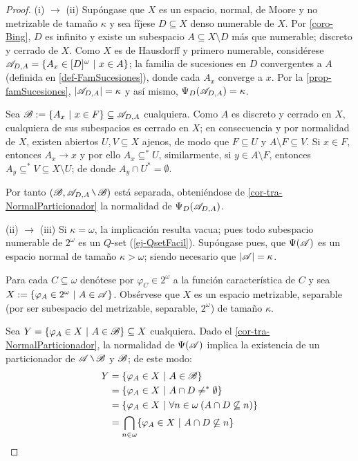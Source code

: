     \begin{proof}
        (i) $\to$ (ii) Supóngase que $X$ es un espacio, normal, de Moore y no metrizable de tamaño $\kappa$ y sea fíjese $D\subseteq X$ denso numerable de $X$. Por \ref{coro-Bing}, $D$ es infinito y existe un subespacio $A \subseteq X \setminus D$ más que numerable; discreto y cerrado de $X$. Como $X$ es de Hausdorff y primero numerable, considérese $ \mathscr{A}_{D,A}=\{A_x \in [D]^\omega \text{ $|$ } x \in A\} $; la familia de sucesiones en $D$ convergentes a $A$ (definida en \ref{def-FamSucesiones}), donde cada $A_x$ converge a $x$. Por la \autoref{prop-famSucesiones}, $|\mathscr{A}_{D,A}|=\kappa$ y así mismo, $\Psi_D(\mathscr{A}_{D,A})=\kappa$.
        
        Sea $\mathscr{B}:=\{A_x \text{ $|$ } x \in F\} \subseteq \mathscr{A}_{D,A}$ cualquiera. Como $A$ es discreto y cerrado en $X$, cualquiera de sus subespacios es cerrado en $X$; en consecuencia y por normalidad de $X$, existen abiertos $U,V \subseteq X$ ajenos, de modo que $F \subseteq U$ y $A \setminus F \subseteq V$. Si $x \in F$, entonces $A_x \to x$ y por ello $A_x \subseteq^* U$, similarmente, si $y \in A \setminus F$, entonces $A_y \subseteq^* V \subseteq X \setminus U$; de donde $A_y \cap U^* = \emptyset$. 

        Por tanto $(\ms{B}, \ms{A}_{D,A} \setminus \ms{B})$ está separada, obteniéndose de \ref{cor-tra-NormalParticionador} la normalidad de $\Psi_D(\mathscr{A}_{D,A})$.
        
        (ii) $\to$ (iii) Si $\kappa = \omega$, la implicación resulta vacua; pues todo subespacio numerable de $2^\omega$ es un $Q$-set (\autoref{ej-QsetFacil}). Supóngase pues, que $\Psi(\mathscr{A})$ es un espacio normal de tamaño $\kappa>\omega$; siendo necesario que $|\mathscr{A}|=\kappa$.
        
        Para cada $C \subseteq \omega$ denótese por $\varphi_C \in 2^ \omega$ a la función característica de $C$ y sea $X:=\{\varphi_A \in 2^\omega \text{ $|$ } A \in \mathscr{A} \}$. Obsérvese que $X$ es un espacio metrizable, separable (por ser subespacio del metrizable, separable, $2^\omega$) de tamaño $\kappa$. 
        
        Sea $Y = \{ \varphi_A \in X \text{ $|$ } A \in \mathscr{B} \} \subseteq X$ cualquiera. Dado el \autoref{cor-tra-NormalParticionador}, la normalidad de $\Psi(\mathscr{A})$ implica la existencia de un particionador de $\ms{A}\setminus \ms{B}$ y $\mathscr{B}$; de este modo:
        \begin{align*}
            Y   & = \{ \varphi_A \in X \text{ $|$ } A \in \mathscr{B} \} \\
                & = \{ \varphi_A \in X \text{ $|$ } A \cap D \neq^* \emptyset \} \\
                & = \{ \varphi_A \in X \text{ $|$ } \forall n \in \omega \: ( A \cap D \not\subseteq n) \} \\
                & = \bigcap_{n \in \omega} \{\varphi_A \in X \text{ $|$ } A \cap D \not\subseteq n\}
        \end{align*}
        

\end{proof}
